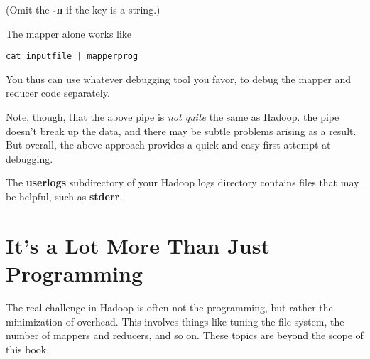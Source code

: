 (Omit the {\bf -n} if the key is a string.)

The mapper alone works like

\begin{lstlisting}
cat inputfile | mapperprog 
\end{lstlisting}

You thus can use whatever debugging tool you favor, to debug the
mapper and reducer code separately.

Note, though, that the above pipe is {\it not quite} the same as Hadoop.
the pipe doesn't break up the data, and there may be subtle problems
arising as a result.  But overall, the above approach provides a quick
and easy first attempt at debugging.

The {\bf userlogs} subdirectory of your Hadoop logs directory contains
files that may be helpful, such as {\bf stderr}.

\section{It's a Lot More Than Just Programming}

The real challenge in Hadoop is often not the programming, but rather
the minimization of overhead.  This involves things like tuning the file
system, the number of mappers and reducers, and so on.  These topics are
beyond the scope of this book.

% 
% 

